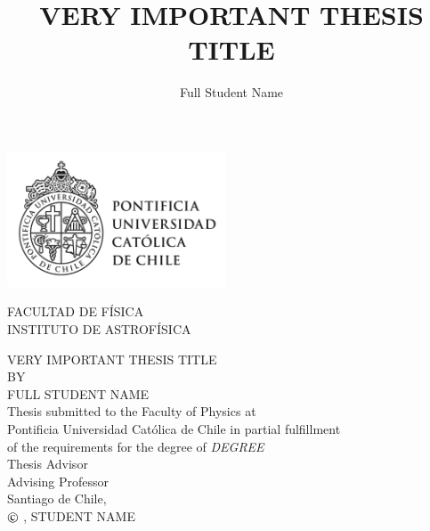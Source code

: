 \documentclass[12pt]{mythesis}
\makeatletter
\newcommand\Romanyear{\@Roman{\year}}
\makeatother
\begin{document}
\title{VERY IMPORTANT THESIS TITLE}
\author{Full Student Name}
\date{}
\maketitle


\newpage
\pagestyle{empty}
\vspace*{-40.0mm}%
\hspace*{-10mm}%
        \parbox{80pt}
{\centering %
            \includegraphics*[width=65mm]{./figures/UC_lineal_TR-01.png}\\[.2\normalbaselineskip]       
        }
\begin{flushright}
\vspace*{-9.0mm}
FACULTAD DE F\'{I}SICA\\
INSTITUTO DE ASTROF\'{I}SICA
\end{flushright}
\begin{center}
\huge{VERY IMPORTANT THESIS TITLE}\\
\vspace{1.5cm}
\normalsize
BY\\
\Large{FULL STUDENT NAME}\\
\vspace{1.5cm}
\normalsize
Thesis submitted to the Faculty of Physics at\\ 
Pontificia Universidad Cat\'{o}lica de Chile in partial fulfillment\\
 of the requirements for the degree of \textit{DEGREE}\\
\vspace{1.5cm}
Thesis Advisor\\
\large{Advising Professor}\\
\vfill
\normalsize
Santiago de Chile, \monthname\, \the\year\\
\vspace{1.cm}
$\copyright$ \Romanyear, STUDENT NAME
\end{center}
\newpage
\end{document}
